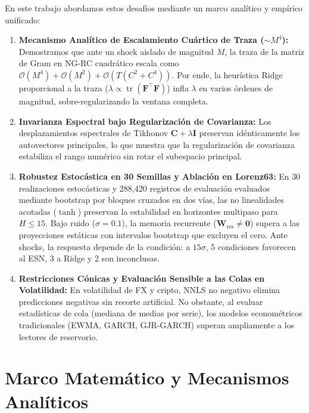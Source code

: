 \documentclass[aip,cha,reprint,amsmath,amssymb]{revtex4-2}
\begin{document}
En este trabajo abordamos estos desafíos mediante un marco analítico y empírico unificado:
\begin{enumerate}
    \item \textbf{Mecanismo Analítico de Escalamiento Cuártico de Traza ($\sim M^4$):} Demostramos que ante un shock aislado de magnitud $M$, la traza de la matriz de Gram en NG-RC cuadrático escala como $\mathcal{O}(M^4) + \mathcal{O}(M^2) + \mathcal{O}(T(C^2+C^4))$. Por ende, la heurística Ridge proporcional a la traza ($\lambda \propto \operatorname{tr}(\mathbf{F}^\top\mathbf{F})$) infla $\lambda$ en varios órdenes de magnitud, sobre-regularizando la ventana completa.
    \item \textbf{Invarianza Espectral bajo Regularización de Covarianza:} Los desplazamientos espectrales de Tikhonov $\mathbf{C} + \lambda\mathbf{I}$ preservan idénticamente los autovectores principales, lo que muestra que la regularización de covarianza estabiliza el rango numérico sin rotar el subespacio principal.
    \item \textbf{Robustez Estocástica en 30 Semillas y Ablación en Lorenz63:} En 30 realizaciones estocásticas y 288,420 registros de evaluación evaluados mediante bootstrap por bloques cruzados en dos vías, las no linealidades acotadas ($\tanh$) preservan la estabilidad en horizontes multipaso para $H \le 15$. Bajo ruido ($\sigma=0.1$), la memoria recurrente ($\mathbf{W}_{\text{res}} \neq \mathbf{0}$) supera a las proyecciones estáticas con intervalos bootstrap que excluyen el cero. Ante shocks, la respuesta depende de la condición: a $15\sigma$, 5 condiciones favorecen al ESN, 3 a Ridge y 2 son inconclusas.
    \item \textbf{Restricciones Cónicas y Evaluación Sensible a las Colas en Volatilidad:} En volatilidad de FX y cripto, NNLS no negativo elimina predicciones negativas sin recorte artificial. No obstante, al evaluar estadísticas de cola (mediana de medias por serie), los modelos econométricos tradicionales (EWMA, GARCH, GJR-GARCH) superan ampliamente a los lectores de reservorio.
\end{enumerate}

\section{Marco Matemático y Mecanismos Analíticos}
\label{sec:math}
\end{document}
